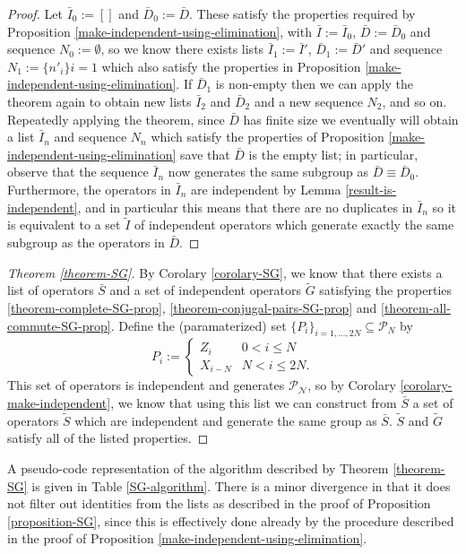 \documentclass[twocolumn,showpacs,preprintnumbers,amsmath,amssymb,nofootinbib,pra,floatfix]{revtex4}
\newenvironment{remark}[1][Remark]{\begin{trivlist}
\item[\hskip \labelsep {\bfseries #1}]}{\end{trivlist}}
\begin{document}
\begin{proof}
Let $\bar I_0 := []$ and $\bar D_0 := \bar D$.  These satisfy the properties required by Proposition \ref{make-independent-using-elimination}, with $\bar I:=\bar I_0$, $\bar D:=\bar D_0$ and sequence $N_0:=\emptyset$, so we know there exists lists $\bar I_1:=\bar I'$, $\bar D_1:=\bar D'$ and sequence $N_1:=\{n'_{i}\}{i=1}$ which also satisfy the properties in Proposition \ref{make-independent-using-elimination}.  If $\bar D_1$ is non-empty then we can apply the theorem again to obtain new lists $\bar I_2$ and $\bar D_2$ and a new sequence $N_2$, and so on.  Repeatedly applying the theorem, since $\bar D$ has finite size we eventually will obtain a list $\bar I_n$ and sequence $N_n$ which satisfy the properties of Proposition \ref{make-independent-using-elimination} save that $\bar D$ is the empty list;  in particular, observe that the sequence $\bar I_n$ now generates the same subgroup as $\bar D\equiv \bar D_0$.  Furthermore, the operators in $\bar I_n$ are independent by Lemma \ref{result-is-independent}, and in particular this means that there are no duplicates in $\bar I_n$ so it is equivalent to a set $\tilde I$ of independent operators which generate exactly the same subgroup as the operators in $\bar D$.
\end{proof}
\begin{proof}[Theorem \ref{theorem-SG}]
By Corolary \ref{corolary-SG}, we know that there exists a list of operators $\bar S$ and a set of independent operators $\tilde G$ satisfying the properties \ref{theorem-complete-SG-prop}, \ref{theorem-conjugal-pairs-SG-prop} and \ref{theorem-all-commute-SG-prop}.  Define the (paramaterized) set $\{P_i\}_{i=1,\dots,2N}\subseteq \mathscr{P}_N$ by
$$
P_i :=
\begin{cases}
Z_i & 0 < i \le N \\
X_{i-N} & N < i \le 2N.
\end{cases}
$$  This set of operators is independent and generates $\mathscr{P_N}$, so by Corolary \ref{corolary-make-independent}, we know that using this list we can construct from $\bar S$ a set of operators $\tilde S$ which are independent and generate the same group as $\bar S$.  $\tilde S$ and $\tilde G$ satisfy all of the listed properties.
\end{proof}
\begin{remark}
A pseudo-code representation of the algorithm described by Theorem \ref{theorem-SG} is given in Table  \ref{SG-algorithm}.  There is a minor divergence in that it does not filter out identities from the lists as described in the proof of Proposition \ref{proposition-SG}, since this is effectively done already by the procedure described in the proof of Proposition \ref{make-independent-using-elimination}.
\end{remark}
\end{document}
